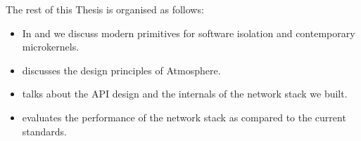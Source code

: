 The rest of this Thesis is organised as follows: 

\begin{itemize}
    \item{In  and  we discuss modern primitives for software isolation and contemporary microkernels.}
    \item{ discusses the design principles of Atmosphere. }
    \item{ talks about the API design and the internals of the network stack we built. }
    \item{ evaluates the performance of the network stack as compared to the current standards. }
\end{itemize}
